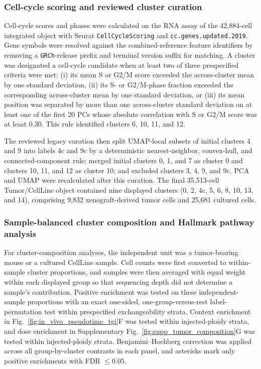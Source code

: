 \documentclass[11pt,notitlepage]{article}
\begin{document}
\subsubsection{Cell-cycle scoring and reviewed cluster curation}
Cell-cycle scores and phases were calculated on the RNA assay of the 42,884-cell integrated object with Seurat \texttt{CellCycleScoring} and \texttt{cc.genes.updated.2019}. Gene symbols were resolved against the combined-reference feature identifiers by removing a \texttt{GRCh}-release prefix and terminal version suffix for matching. A cluster was designated a cell-cycle candidate when at least two of three prespecified criteria were met: (i) its mean S or G2/M score exceeded the across-cluster mean by one standard deviation, (ii) its S- or G2/M-phase fraction exceeded the corresponding across-cluster mean by one standard deviation, or (iii) its mean position was separated by more than one across-cluster standard deviation on at least one of the first 20 PCs whose absolute correlation with S or G2/M score was at least 0.30. This rule identified clusters 6, 10, 11, and 12.

The reviewed legacy curation then split UMAP-local subsets of initial clusters 4 and 9 into labels 4c and 9c by a deterministic nearest-neighbor, convex-hull, and connected-component rule; merged initial clusters 0, 1, and 7 as cluster 0 and clusters 10, 11, and 12 as cluster 10; and excluded clusters 3, 4, 9, and 9c. PCA and UMAP were recalculated after this curation. The final 35,513-cell Tumor/CellLine object contained nine displayed clusters (0, 2, 4c, 5, 6, 8, 10, 13, and 14), comprising 9,832 xenograft-derived tumor cells and 25,681 cultured cells.


\subsubsection{Sample-balanced cluster composition and Hallmark pathway analysis}
For cluster-composition analyses, the independent unit was a tumor-bearing mouse or a cultured CellLine sample. Cell counts were first converted to within-sample cluster proportions, and samples were then averaged with equal weight within each displayed group so that sequencing depth did not determine a sample's contribution. Positive enrichment was tested on these independent-sample proportions with an exact one-sided, one-group-versus-rest label-permutation test within prespecified exchangeability strata. Context enrichment in Fig.~\ref{fig:in_vivo_pseudotime_tgi}F was tested within injected-ploidy strata, and dose enrichment in Supplementary Fig.~\ref{fig:supp_tumor_composition}G was tested within injected-ploidy strata. Benjamini--Hochberg correction was applied across all group-by-cluster contrasts in each panel, and asterisks mark only positive enrichments with FDR $\leq 0.05$.
\end{document}
